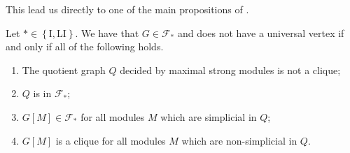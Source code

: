 \documentclass{article}
\begin{document}
    This lead us directly to
    one of the main propositions 
    of \cite{main}.
    
    \begin{prop} \label{main prop}
        Let $* \in \left\{\text{I}, \text{LI}\right\}$. We have that
        $G \in \mathcal{F}_{*}$ and does not have a universal vertex
        if and only if all of the following holds.
        \begin{enumerate}
            \item The quotient graph $Q$ decided by maximal strong modules
                is not a clique; \label{1}
            \item $Q$ is in $\mathcal{F}_{*}$; \label{2}
            \item $G[M] \in \mathcal{F}_{*}$ for all modules $M$ which are simplicial in $Q$; \label{3}
            \item $G[M]$ is a clique for all modules $M$ which are non-simplicial in $Q$. \label{4}
        \end{enumerate}
    \end{prop}
\end{document}

